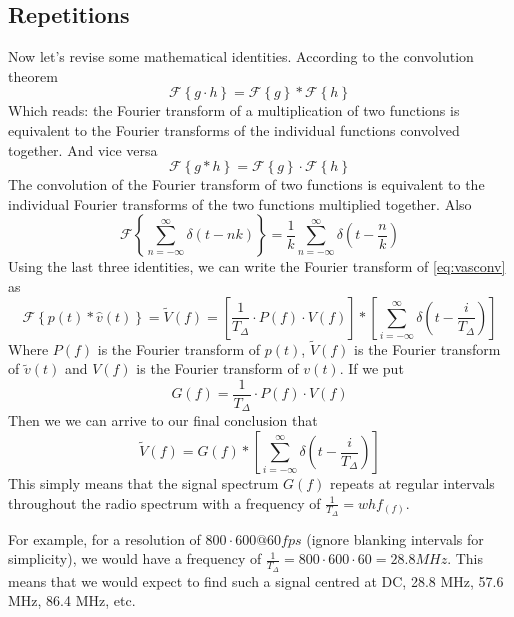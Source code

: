 \documentclass[a4paper,12pt,twoside,openright]{report}
\begin{document}
\subsection{Repetitions}
Now let's revise some mathematical identities. According to the convolution theorem
\begin{equation}
\mathcal{F} \left\{ g \cdot h \right\} = \mathcal{F} \left\{ g \right\} \ast  \mathcal{F} \left\{ h \right\}
\end{equation}
Which reads: the Fourier transform of a multiplication of two functions is equivalent to the Fourier transforms of the individual functions convolved together. And vice versa
\begin{equation}
\mathcal{F} \left\{ g \ast h \right\} = \mathcal{F} \left\{ g \right\} \cdot  \mathcal{F} \left\{ h \right\}
\end{equation}
The convolution of the Fourier transform of two functions is equivalent to the individual Fourier transforms of the two functions multiplied together.
Also
\begin{equation}
\mathcal{F} \left\{ \sum\limits_{n=-\infty}^{\infty}  \delta(t-n k) \right\} = \frac{1}{k} \sum\limits_{n=-\infty}^{\infty}  \delta \left( t-\frac{n}{k} \right)
\end{equation}
Using the last three identities, we can write the Fourier transform of \ref{eq:vasconv} as
\begin{equation} 
\mathcal{F} \left\{ p(t) \ast \hat{v}(t) \right\} = \tilde{V}(f) =
\left[ \frac{1}{T_{\Delta}} \cdot P(f) \cdot V(f) \right] \ast
\left[ \sum\limits_{i=-\infty}^{\infty}  \delta \left( t-\frac{i}{T_{\Delta}} \right) \right]
\end{equation}
Where $P(f)$ is the Fourier transform of $p(t)$, $\tilde{V}(f)$ is the Fourier transform of $\tilde{v}(t)$ and $V(f)$ is the Fourier transform of $v(t)$. If we put 
\begin{equation} 
\label{eq:gfdef}
G(f) = \frac{1}{T_{\Delta}} \cdot P(f) \cdot V(f)
\end{equation}
Then we we can arrive to our final conclusion that
\begin{equation}
\label{eq:vspectrum}
\tilde{V}(f) = G(f) \ast
\left[ \sum\limits_{i=-\infty}^{\infty}  \delta \left( t-\frac{i}{T_{\Delta}} \right) \right]
\end{equation}
This simply means that the signal spectrum $G(f)$ repeats at regular intervals throughout the radio spectrum with a frequency of $\frac{1}{T_{\Delta}} = w h f_(f)$.

For example, for a resolution of $800 \cdot 600 @ 60fps$ (ignore blanking intervals for simplicity), we would have a frequency of $\frac{1}{T_{\Delta}} = 800 \cdot 600 \cdot 60 = 28.8 MHz$. This means that we would expect to find such a signal centred at DC, 28.8 MHz, 57.6 MHz, 86.4 MHz, etc.
\end{document}
